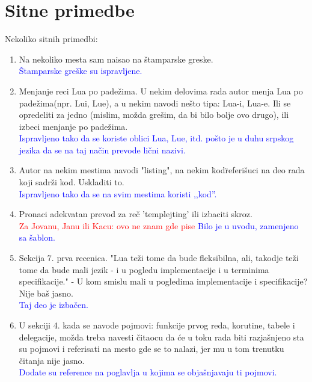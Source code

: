 \documentclass[a4paper]{report}
\newcommand{\odgovorAutora}[1]{\textcolor{blue}{#1}}
\newcommand{\note}[1]{\textcolor{red}{#1}}
\begin{document}
\section{Sitne primedbe}
Nekoliko sitnih primedbi:
\begin{enumerate}
  \item Na nekoliko mesta sam naisao na \v stamparske greske. \\
  \odgovorAutora{Štamparske greške su ispravljene.}
  \item Menjanje reci Lua po pade\v zima. U nekim delovima rada autor menja Lua po pade\v zima(npr. Lui, Lue), a u nekim navodi ne\v sto tipa: Lua-i, Lua-e. Ili se opredeliti za jedno (mislim, mo\v zda gre\v sim, da bi bilo bolje ovo drugo), ili izbeci menjanje po pade\v zima. \\
  \odgovorAutora{Ispravljeno tako da se koriste oblici Lua, Lue, itd. pošto je u duhu srpskog jezika da se na taj način prevode lični nazivi.}
  \item Autor na nekim mestima navodi "listing", na nekim \"kod\"  referi\v suci na deo rada koji sadr\v zi kod. Uskladiti to. \\
  \odgovorAutora{Ispravljeno tako da se na svim mestima koristi ,,kod''.}
  \item Pronaci adekvatan prevod za re\v c 'templejting'  ili izbaciti skroz. \\
  \note{Za Jovanu, Janu ili Kacu: ovo ne znam gde pise}
  \odgovorAutora{Bilo je u uvodu, zamenjeno sa šablon.}

  \item Sekcija 7. prva recenica. "Lua te\v zi tome da bude fleksibilna, ali, takodje te\v zi tome da bude mali
jezik - i u pogledu implementacije i u terminima specifikacije." - U kom smislu mali u pogledima implementacije i specifikacije? Nije ba\v s jasno. \\
  \odgovorAutora{Taj deo je izbačen.}
  \item U sekciji 4. kada se navode pojmovi: funkcije prvog reda, korutine, tabele i delegacije, mo\v zda treba navesti \v citaocu da \' ce u toku rada biti razja\v snjeno sta su pojmovi i referisati na mesto gde se to nalazi, jer mu u tom trenutku \v citanja nije jasno. \\
  \odgovorAutora{Dodate su reference na poglavlja u kojima se objašnjavaju ti pojmovi.}

\end{enumerate}
\end{document}
